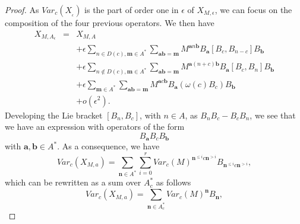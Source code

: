 \documentclass[english,11pt]{amsart}
\def\nn{\mathbf{n}}
\def\aa{\mathbf{a}}
\def\bb{\mathbf{b}}
\def\bm{\mathbf{m}}
\def\di{\displaystyle}
\def\nn{\mathbf{n}}
\begin{document}
\begin{proof}
As $Var_c (X_{_{\epsilon}})$ is the part of order one in $\epsilon$ of $X_{M,\epsilon}$,  we can focus on the composition of the four previous operators. We then have   
\begin{equation}
\left .
\begin{array}{lll}
    X_{M,A_{\epsilon}} & = & X_{M,A} \\
    & & +\epsilon 
    \di\sum_{n\in D(c) , \bm \in A^*} \di\sum_{\aa \bb =\bm} M^{\aa n \bb} B_{\aa} [B_c , B_{n-c} ] B_{\bb} \\
    & & +\epsilon \di\sum_{n\not\in D(c) , \bm \in A^*} \di\sum_{\aa \bb =\bm} M^{\aa (n+c)\bb} B_{\aa} [B_c ,B_n ] B_{\bb}  \\
    & & +\epsilon \di\sum_{\bm \in A^*} \di\sum_{\aa \bb =\bm} M^{\aa c\bb} B_{\aa} (\omega (c) B_c ) B_{\bb} \\
    & & +o(\epsilon^2 ) .    
\end{array}
\right .
\end{equation}
Developing the Lie bracket $[B_n ,B_c]$, with $n\in A$, as $B_n B_c -B_c B_n$, we see that we have an expression with operators of the form 
\begin{equation}
    B_{\aa} B_c B_{\bb}
\end{equation}
with $\aa, \bb \in A^*$. As a consequence, we have 
\begin{equation}
    Var_c (X_{M,a} ) =\di\sum_{\nn\in A^*} \di\sum_{i=0}^r  Var_c (M)^{\nn^{\leq i} c\nn^{>i}} B_{\nn^{\leq i} c\nn^{>i}} ,
\end{equation}
which can be rewritten as a sum over $A_c^*$ as follows 
\begin{equation}
    Var_c (X_{M,a} ) =\di\sum_{\nn\in A_c^*} Var_c (M)^{\nn} B_{\nn} ,
\end{equation}


\end{proof}
\end{document}
